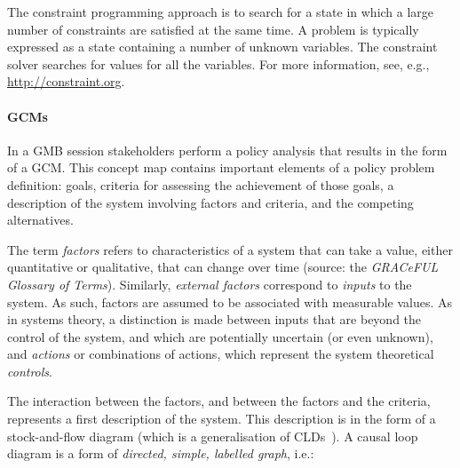 The constraint programming approach is to search for a state in which
a large number of constraints are satisfied at the same time.
%
A problem is typically expressed as a state containing a number of
unknown variables.
%
The constraint solver searches for values for all the variables.
%
For more information, see, e.g., \url{http://constraint.org}.

\paragraph{\acfp{GCM}}




In a \acl{GMB} session stakeholders perform a policy analysis that
results in the form of a \acl{GCM}.
%
This concept map contains important elements of a policy problem
definition: goals, criteria for assessing the achievement of those
goals, a description of the system involving factors and criteria, and
the competing alternatives.

The term \emph{factors} refers to characteristics of a system that can
take a value, either quantitative or qualitative, that can change over
time (source: the \emph{GRACeFUL Glossary of Terms}).
%
Similarly, \emph{external factors} correspond to \emph{inputs} to the
system.
%
As such, factors are assumed to be associated with measurable
values.
%
As in systems theory, a distinction is made between inputs that are
beyond the control of the system, and which are potentially uncertain
(or even unknown), and \emph{actions} or combinations of actions,
which represent the system theoretical \emph{controls}.

The interaction between the factors, and between the factors and the
criteria, represents a first description of the system.
%
This description is in the form of a stock-and-flow diagram (which is
a generalisation of \aclp{CLD}~\cite{burns}).
%
A causal loop diagram is a form of \emph{directed, simple, labelled
  graph}, i.e.:

